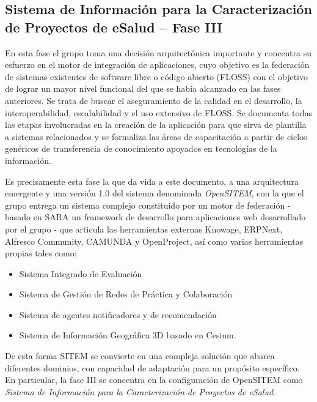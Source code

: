 \subsection{Sistema de Información para la Caracterización de Proyectos de eSalud – Fase III}

En esta fase el grupo toma una decisión arquitectónica importante y concentra su esfuerzo en el motor de integración de aplicaciones, cuyo objetivo es la federación de sistemas existentes de software libre o código abierto (FLOSS) con el objetivo de lograr un mayor nivel funcional del que se había alcanzado en las fases anteriores. Se trata de buscar el aseguramiento de la calidad en el desarrollo, la interoperabilidad, escalabilidad y el uso extensivo de FLOSS. Se documenta todas las etapas involucradas en la creación de la aplicación para que sirva de plantilla a sistemas relacionados y se formaliza las áreas de capacitación a partir de ciclos genéricos de transferencia de conocimiento apoyados en tecnologías de la información.

Es precisamente esta fase la que da vida a este documento, a una arquitectura emergente y una versión 1.0 del sistema denominada \textit{OpenSITEM}, con la que el grupo entrega un sistema complejo constituido por un motor de federación - basado en SARA un framework de desarrollo para aplicaciones web desarrollado por el grupo - que articula las herramientas externas Knowage, ERPNext, Alfresco Community, CAMUNDA y OpenProject, así como varias herramientas propias tales como:

\begin{itemize}
\item Sistema Integrado de Evaluación
\item Sistema de Gestión de Redes de Práctica y Colaboración
\item Sistema de agentes notificadores y de recomendación
\item Sistema de Información Geográfica 3D basado en Cesium.
\end{itemize}

De esta forma SITEM se convierte en una compleja solución que abarca diferentes dominios, con capacidad de adaptación para un propósito específico. En particular, la fase III se concentra en la configuración de OpenSITEM como \textit{Sistema de Información para la Caracterización de Proyectos de eSalud}.


